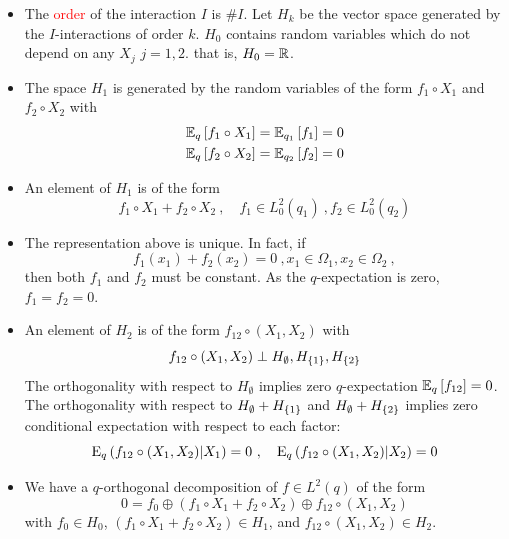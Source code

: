 \documentclass[xcolor=svgnames]{beamer}
\newcommand{\rosso}[1]{\textcolor{red}{#1}}
\renewcommand{\emph}{\rosso}
\begin{document}
\begin{frame}
\begin{itemize}
    \item The \emph{order} of the interaction $I$ is $\# I$. Let $H_k$ be the vector space generated by the $I$-interactions of order $k$. $H_0$ contains random variables which do not depend on any $X_j$ $j=1,2$. that is, $H_0 = \mathbb{R}$.
    \item The space $H_1$ is generated by the random variables of the form 
        $f_1\circ X_1$ and $f_2\circ X_2$
    with 
    \begin{gather*}
        \operatorname{\mathbb E}_{q}\left[f_1\circ X_1\right] = \operatorname{\mathbb E}_{q_1}\left[f_1\right] = 0 \\
           \operatorname{\mathbb E}_{q}\left[f_2\circ X_2\right] = \operatorname{\mathbb E}_{q_2}\left[f_2\right] = 0 
    \end{gather*}
   \item An element of $H_1$ is of the form
   \begin{equation*}
       f_1\circ X_1 + f_2 \circ X_2 \ , \quad f_1 \in L^2_0(q_1) \ , f_2 \in L^2_0(q_2)
   \end{equation*}
   \item The representation above is unique. In fact, if
   \begin{equation*}
       f_1(x_1) + f_2(x_2) = 0 \ , x_1 \in \Omega_1, x_2 \in \Omega_2 \ ,
   \end{equation*}
   then both $f_1$ and $f_2$ must be constant. As the $q$-expectation is zero, $f_1 = f_2 = 0$.
   \item An element of $H_2$ is of the form $f_{12} \circ(X_1,X_2)$ with
   \begin{equation*}
     f_{12} \circ(X_1,X_2) \perp H_{\emptyset}, H_{\left\{1\right\}}, H_{\left\{2\right\}}  
   \end{equation*}
   The orthogonality with respect to $H_{\emptyset}$ implies zero $q$-expectation $\operatorname{\mathbb E}_{q}\left[f_{12}\right] = 0$. The orthogonality with respect to $H_{\emptyset} + H_{\left\{1\right\}}$ and $H_{\emptyset} + H_{\left\{2\right\}}$ implies zero conditional expectation with respect to each factor:
   \begin{equation*}
       \operatorname{E}_{q}\left(f_{12} \circ (X_1,X_2) \middle| X_1\right) = 0 \ , \quad \operatorname{E}_{q}\left(f_{12} \circ (X_1,X_2) \middle| X_2\right) = 0
   \end{equation*}
    \item We have a $q$-orthogonal decomposition of $f \in L^2(q)$ of the form
    \begin{equation*}
    0 = f_0 \oplus (f_1\circ X_1 + f_2\circ X_2) \oplus f_{12}\circ (X_1,X_2)
    \end{equation*}
    with $f_0 \in H_0$, $(f_1\circ X_1 + f_2\circ X_2) \in H_1$, and $f_{12}\circ (X_1,X_2) \in H_2$. 

\end{itemize}
\end{frame}
\end{document}
